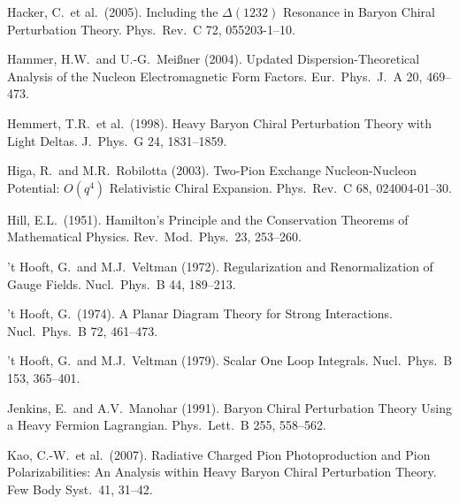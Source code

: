 \documentclass[twoside,12pt]{article}
\begin{document}
\begin{thebibliography}{}
Hacker, C.~et al.~(2005).
Including the $\Delta(1232)$ Resonance in Baryon Chiral Perturbation Theory.
Phys.\ Rev.\  C 72, 055203-1--10.

Hammer, H.W.~and U.-G.~Mei{\ss}ner (2004).
Updated Dispersion-Theoretical Analysis of the Nucleon Electromagnetic
Form Factors.
Eur.\ Phys.\ J.\  A 20, 469--473.

Hemmert, T.R.~et al.~(1998).
Heavy Baryon Chiral Perturbation Theory with Light Deltas.
J.\ Phys.\ G 24, 1831--1859.

Higa, R.~and M.R.~Robilotta (2003).
Two-Pion Exchange Nucleon-Nucleon Potential: $O(q^4)$ Relativistic Chiral
Expansion.
Phys.\ Rev.\  C 68, 024004-01--30.


Hill, E.L.~(1951).
Hamilton's Principle and the Conservation Theorems of Mathematical Physics.
Rev.\ Mod.\ Phys.\ 23, 253--260.

't Hooft, G.~and M.J.~Veltman (1972).
Regularization and Renormalization of Gauge Fields.
Nucl.\ Phys.\  B 44, 189--213.

't Hooft, G.~(1974).
A Planar Diagram Theory for Strong Interactions.
Nucl.\ Phys.\  B 72, 461--473.

't Hooft, G.~and M.J.~Veltman (1979).
Scalar One Loop Integrals.
Nucl.\ Phys.\  B 153, 365--401.

Jenkins, E.~and A.V.~Manohar (1991).
Baryon Chiral Perturbation Theory Using a Heavy Fermion Lagrangian.
Phys.\ Lett.\ B 255, 558--562.

Kao, C.-W.~et al.~(2007).
Radiative Charged Pion Photoproduction and Pion Polarizabilities: An Analysis
within Heavy Baryon Chiral Perturbation Theory.
Few Body Syst.\  41, 31--42.


\end{thebibliography}
\end{document}
